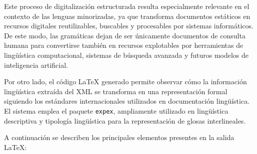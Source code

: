 Este proceso de digitalización estructurada resulta especialmente relevante en el contexto de las lenguas minorizadas, ya que transforma documentos estáticos en recursos digitales reutilizables, buscables y procesables por sistemas informáticos. De este modo, las gramáticas dejan de ser únicamente documentos de consulta humana para convertirse también en recursos explotables por herramientas de lingüística computacional, sistemas de búsqueda avanzada y futuros modelos de inteligencia artificial.

Por otro lado, el código LaTeX generado permite observar cómo la información lingüística extraída del XML se transforma en una representación formal siguiendo los estándares internacionales utilizados en documentación lingüística. El sistema emplea el paquete \texttt{expex}, ampliamente utilizado en lingüística descriptiva y tipología lingüística para la representación de glosas interlineales.

A continuación se describen los principales elementos presentes en la salida LaTeX:

